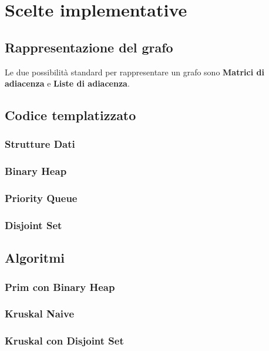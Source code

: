 \section{Scelte implementative}
\label{cap:implementation-choices}

\subsection{Rappresentazione del grafo}

Le due possibilità standard per rappresentare un grafo sono \textbf{Matrici di adiacenza} e \textbf{Liste di adiacenza}.

\subsection{Codice templatizzato}

\subsubsection{Strutture Dati}

\subsubsection{Binary Heap}

\iffalse
The class that implements a Binary Heap data structure
can be instantiated as a MinHeap or a MaxHeap at compile-time. \\

We spared the \complexityN{} time required to build the heap at the beginning of Prim's algorithm because the \textit{std::vector} we use to initialize the list already respects the MinHeap property: the key related to the first element is 0, and every other key is $+\infty$. \\
\fi

\subsubsection{Priority Queue}

\subsubsection{Disjoint Set}

\subsection{Algoritmi}

\subsubsection{Prim con Binary Heap}

\subsubsection{Kruskal Naive}

\subsubsection{Kruskal con Disjoint Set}
